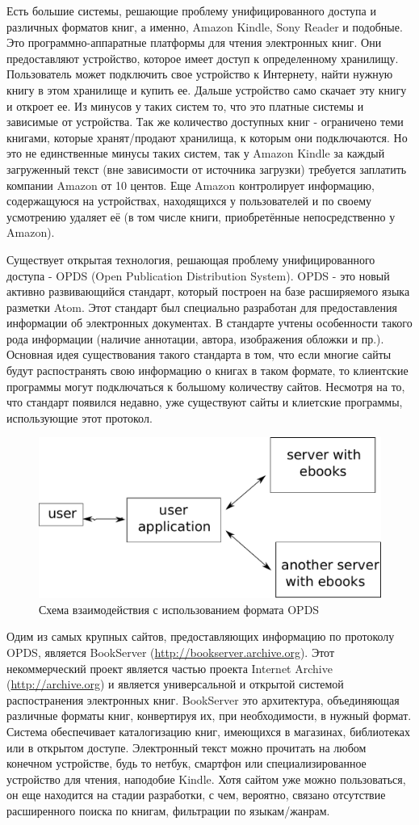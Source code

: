 \documentclass[a4paper]{report}
\begin{document}
Есть большие системы, решающие проблему унифицированного доступа и различных форматов книг, а именно, Amazon Kindle, Sony Reader и подобные. 
Это программно-аппаратные платформы для чтения электронных книг. Они предоставляют устройство, которое имеет доступ к определенному хранилищу. Пользователь может подключить свое устройство к Интернету, найти нужную книгу в этом хранилище и купить ее. Дальше устройство само скачает эту книгу и откроет ее.
Из минусов у таких систем то, что это платные системы и зависимые от устройства. Так же количество доступных книг - ограничено теми книгами, которые хранят/продают хранилища, к которым они подключаются. Но это не единственные минусы таких систем, так у Amazon Kindle за каждый загруженный текст (вне зависимости от источника загрузки) требуется заплатить компании Amazon от 10 центов. Еще Amazon контролирует информацию, содержащуюся на устройствах, находящихся у пользователей и по своему усмотрению удаляет её (в том числе книги, приобретённые непосредственно у Amazon).

Существует открытая технология, решающая проблему унифицированного доступа  - OPDS (Open Publication Distribution System).
OPDS - это новый активно развивающийся стандарт, который построен на базе расширяемого языка разметки Atom. Этот стандарт был специально разработан для предоставления информации об электронных документах. В стандарте учтены особенности такого рода информации (наличие аннотации, автора, изображения обложки и пр.).
Основная идея существования такого стандарта в том, что если многие сайты будут распостранять свою информацию о книгах в таком формате, то клиентские программы могут подключаться к большому количеству сайтов. Несмотря на то, что стандарт появился недавно, уже существуют сайты и клиетские программы, использующие этот протокол. 

\begin{figure}
\centering
\includegraphics[width=.5\textwidth]{scheme}
\caption{Схема взаимодействия с использованием формата OPDS}\label{fig:scheme}
\end{figure}

Одим из самых крупных сайтов, предоставляющих информацию по протоколу OPDS, является BookServer (\url{http://bookserver.archive.org}).
Этот некоммерческий проект является частью проекта Internet Archive (\url{http://archive.org}) и является универсальной и открытой системой распостранения электронных книг. BookServer это архитектура, объединяющая различные форматы книг, конвертируя их, при необходимости, в нужный формат. Система обеспечивает каталогизацию книг, имеющихся в магазинах, библиотеках или в открытом доступе. Электронный текст можно прочитать на любом конечном устройстве, будь то нетбук, смартфон или специализированное устройство для чтения, наподобие Kindle. Хотя сайтом уже можно пользоваться, он еще находится на стадии разработки, с чем, вероятно, связано отсутствие расширенного поиска по книгам, фильтрации по языкам/жанрам. 
\end{document}
